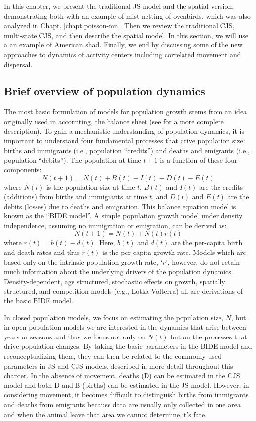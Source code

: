 In this chapter, we present the traditional JS model and
the spatial version, demonstrating both with an example of mist-netting of ovenbirds,
which was also analyzed in Chapt. \ref{chapt.poisson-mn}.  Then we review the
traditional CJS, multi-state CJS, and then describe the spatial model.  In this
section, we will use a an example of American shad.  Finally, we end by discussing
some of the new approaches to dynamics of activity centers including correlated
movement and dispersal.



\subsection{Brief overview of population dynamics}

The most basic formulation of models for population growth stems from
an idea originally used in accounting, the balance sheet (see \citet[][Chapt. 3]{conroy_carroll:2009}
for a more complete description).  To gain a
mechanistic understanding of population dynamics, it is important to
understand four fundamental processes that drive population size:
births and immigrants (i.e., population ``credits'') and deaths and
emigrants (i.e., population ``debits'').  The population at time $t+1$
is a function of these four components:
\[
N(t+1) = N(t) + B(t) + I(t) - D(t) - E(t)
\]
where $N(t)$ is the population size at time $t$, $B(t)$ and $I(t)$ are
the credits (additions) from births and immigrants at time $t$, and
$D(t)$ and $E(t)$ are the debits (losses) due to deaths and
emigration.  This balance equation model is known as the ``BIDE
model''.  A simple population growth model under density independence,
assuming no immigration or emigration, can be derived as:
\[
N(t+1) = N(t) + N(t)r(t)
\]
where $r(t) = b(t) - d(t)$.  Here, $b(t)$ and $d(t)$ are the
per-capita birth and death rates and thus $r(t)$ is the per-capita
growth rate. Models which are based only on the intrinsic population
growth rate, `$r$', however, do not retain much information about the
underlying drivers of the population dynamics.  Density-dependent, age
structured, stochastic effects on growth, spatially structured, and
competition models (e.g., Lotka-Volterra) all are derivations of the
basic BIDE model.

In closed population models, we focus on estimating the population
size, $N$, but in open population models we are interested in the
dynamics that arise between years or seasons and thus we focus not
only on $N(t)$ but on the processes that drive population changes.
By taking the basic parameters in the BIDE model and reconceptualizing
them, they can then be related to the commonly used parameters in JS
and CJS models, described in more detail throughout this chapter. In
the absence of movement, deaths (D) can be estimated in the CJS model
and both D and B (births) can be estimated in the JS model.  However,
in considering movement, it becomes difficult to distinguish births
from immigrants and deaths from emigrants because data are usually only 
collected in one area and when the animal leave that area we 
cannot determine it's fate.
 

